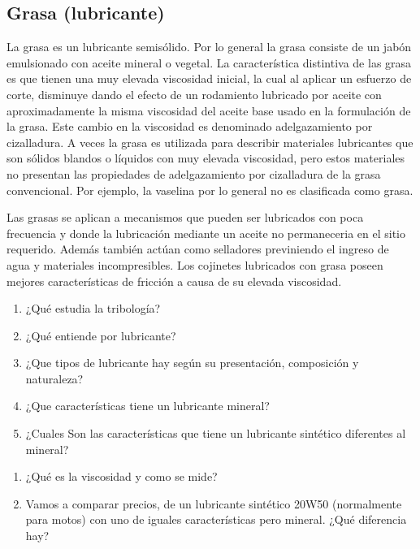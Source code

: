 \documentclass[../main]{subfiles}
\begin{document}
\subsection{Grasa (lubricante)}


La grasa es un lubricante semisólido. Por lo general la grasa consiste de un jabón emulsionado con aceite mineral o vegetal. La característica distintiva de las grasa es que tienen una muy elevada viscosidad inicial, la cual al aplicar un esfuerzo de corte, disminuye dando el efecto de un rodamiento lubricado por aceite con aproximadamente la misma viscosidad del aceite base usado en la formulación de la grasa. Este cambio en la viscosidad es denominado adelgazamiento por cizalladura. A veces la grasa es utilizada para describir materiales lubricantes que son sólidos blandos o líquidos con muy elevada viscosidad, pero estos materiales no presentan las propiedades de adelgazamiento por cizalladura de la grasa convencional. Por ejemplo, la vaselina por lo general no es clasificada como grasa.

Las grasas se aplican a mecanismos que pueden ser lubricados con poca frecuencia y donde la lubricación mediante un aceite no permaneceria en el sitio requerido. Además también actúan como selladores previniendo el ingreso de agua y materiales incompresibles. Los cojinetes lubricados con grasa poseen mejores características de fricción a causa de su elevada viscosidad.



\newpage
{}
\begin{enumerate}
    \item ¿Qué estudia la tribología? 
    \item ¿Qué entiende por lubricante?
    \item ¿Que tipos de lubricante hay según su presentación, composición y naturaleza?
    \item ¿Que características tiene un lubricante mineral?
    \item ¿Cuales Son las características que tiene un lubricante sintético diferentes al mineral?
\end{enumerate}
\begin{enumerate}
    \item ¿Qué es la viscosidad y como se mide?
    \item Vamos a comparar precios, de un lubricante sintético 20W50 (normalmente para motos) con uno de iguales características pero mineral. ¿Qué diferencia hay?
    
    
    
\end{enumerate}
\end{document}
